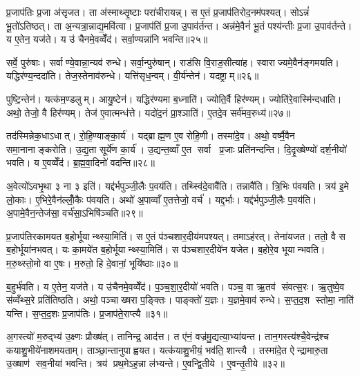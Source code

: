 प्र॒जाप॑तिः प्र॒जा अ॑सृजत। ता अ॑स्माथ्सृ॒ष्टाः परा॑चीरायन्न्। स ए॒तं प्र॒जाप॑तिरोद॒नम॑पश्यत्। सोऽन्नं॑ भू॒तो॑ऽतिष्ठत्। ता अ॒न्यत्रा॒न्नाद्य॒मवि॑त्वा। प्र॒जाप॑तिं प्र॒जा उ॒पाव॑र्तन्त। अन्न॑मे॒वैनं॑ भू॒तं पश्य॑न्तीः प्र॒जा उ॒पाव॑र्तन्ते। य ए॒तेन॒ यज॑ते। य उ॑ चैनमे॒वव्वेँद॑। सर्वा॒ण्यन्ना॑नि भवन्ति॥२५॥

सर्वे॒ पुरु॑षाः। सर्वाण्ये॒वान्ना॒न्यव॑ रुन्धे। सर्वा॒न्पुरु॑षान्। राड॑सि वि॒राड॒सीत्या॑ह। स्वाराज्यमे॒वैन॑ङ्गमयति। यद्धिर॑ण्य॒न्ददा॑ति। तेज॒स्तेनाव॑रुन्धे। यत्ति॑सृध॒न्वम्। वी॒र्य॑न्तेन॑। यदष्ट्राम्॥२६॥

पुष्टि॒न्तेन॑। यत्क॑म॒ण्डलुम्। आयु॒ष्टेन॑। यद्धिर॑ण्यमा ब॒ध्नाति॑। ज्योति॒र्वै हिर॑ण्यम्। ज्योति॑रे॒वास्मि॑न्दधाति। अथो॒ तेजो॒ वै हिर॑ण्यम्। तेज॑ ए॒वात्मन्ध॑त्ते। यदो॑द॒नं प्रा॒श्ञाति॑। ए॒तदे॒व सर्व॑मव॒रुध्य॑॥२७॥

तद॑स्मिन्नेक॒धाऽधात्। रो॒हि॒ण्याङ्का॒र्य॑। यद्ब्राह्म॒ण ए॒व रो॑हि॒णी। तस्मा॑दे॒व। अथो॒ वर्ष्मै॒वैन समा॒नानाङ्करोति। उ॒द्य॒ता सूर्ये॑ण का॒र्य॑। उ॒द्यन्त॒व्वाँ ए॒त सर्वा प्र॒जाः प्रति॑नन्दन्ति। दि॒दृ॒ख्षेण्यो॑ दर्\mbox{}श॒नीयो॑ भवति। य ए॒वव्वेँद॑। ब्र॒ह्म॒वा॒दिनो॑ वदन्ति॥२८॥

अ॒वेत्यो॑ऽवभृ॒था ३ ना ३ इति॑। यद्द॑र्भपुञ्जी॒लैः प॒वय॑ति। तथ्स्वि॑दे॒वावै॑ति। तन्नावै॑ति। त्रि॒भिः प॑वयति। त्रय॑ इ॒मे लो॒काः। ए॒भिरे॒वैन॑ल्लोँ॒कैः प॑वयति। अथो॑ अ॒पाव्वाँ ए॒तत्तेजो॒ वर्च॑। यद्द॒र्भाः। यद्द॑र्भपुञ्जी॒लैः प॒वय॑ति। अ॒पामे॒वैन॒न्तेज॑सा॒ वर्च॑सा॒ऽभिषि॑ञ्चति॥२९॥\anuvakamend[भ॒व॒न्त्यष्ट्रा॑मव॒रुध्य॑ वदन्ति द॒र्भा यद्द॑र्भपुञ्जी॒लैः प॒वय॒त्येक॑ञ्च]

प्र॒जाप॑तिरकामयत ब॒होर्भूयान्थ्स्या॒मिति॑। स ए॒तं प॑ञ्चशार॒दीय॑मपश्यत्। तमाऽह॑रत्। तेना॑यजत। ततो॒ वै स ब॒होर्भूया॑नभवत्। यः का॒मये॑त ब॒होर्भूयान्थ्स्या॒मिति॑। स प॑ञ्चशार॒दीये॑न यजेत। ब॒होरे॒व भूयान्भवति। म॒रु॒थ्स्तो॒मो वा ए॒षः। म॒रुतो॒ हि दे॒वानां॒ भूयि॑ष्ठाः॥३०॥

ब॒हुर्भ॑वति। य ए॒तेन॒ यज॑ते। य उ॑चैनमे॒वव्वेँद॑। प॒ञ्च॒शा॒र॒दीयो॑ भवति। पञ्च॒ वा ऋ॒तव॑ संवत्स॒रः। ऋ॒तुष्वे॒व स॑व्वँथ्स॒रे प्रति॑तिष्ठति। अथो॒ पञ्चाख्षरा प॒ङ्क्तिः। पाङ्क्तो॑ य॒ज्ञः। य॒ज्ञमे॒वाव॑ रुन्धे। स॒प्त॒द॒श स्तोमा॒ नाति॑ यन्ति। स॒प्त॒द॒शः प्र॒जाप॑तिः। प्र॒जाप॑ते॒राप्त्यै॥३१॥\anuvakamend[भूयि॑ष्ठा यन्ति॒ द्वे च॑]

अ॒गस्त्यो॑ म॒रुद्भ्य॑ उ॒क्ष्णः प्रौख्ष॑त्। तानिन्द्र॒ आद॑त्त। त ए॑नं॒ वज्र॑मु॒द्यत्या॒भ्या॑यन्त। तान॒गस्त्य॑श्चै॒वेन्द्र॑श्च कयाशु॒भीये॑नाशमयताम्। ताञ्छा॒न्तानुपाह्वयत। यत्क॑याशु॒भीयं॒ भव॑ति॒ शान्त्यै। तस्मा॑दे॒त ऐन्द्रामारु॒ता उ॒ख्षाण॑ सव॒नीया॑ भवन्ति। त्रय॑ प्रथ॒मेऽह॒न्ना ल॑भ्यन्ते। ए॒वन्द्वि॒तीये। ए॒वन्तृ॒तीये॥३२॥

